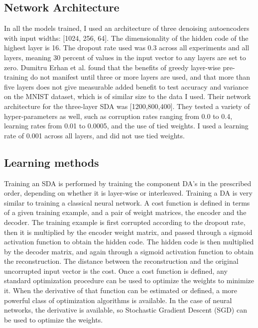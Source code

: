\documentclass[12pt]{article}
\begin{document}
\begin{doublespacing}
	\subsection{Network Architecture}
	In all the models trained, I used an architecture of three denoising autoencoders with input widths: [1024, 256, 64]. The dimensionality of the hidden code of the highest layer is 16. The dropout rate used was 0.3 across all experiments and all layers, meaning 30 percent of values in the input vector to any layers are set to zero. Dumitru Erhan et al. \cite{erhan2009difficulty} found that the benefits of greedy layer-wise pre-training do not manifest until three or more layers are used, and that more than five layers does not give measurable added benefit to test accuracy and variance on the MNIST dataset, which is of similar size to the data I used. Their network architecture for the three-layer SDA was [1200,800,400]. They tested a variety of hyper-parameters as well, such as corruption rates ranging from 0.0  to 0.4,  learning rates from 0.01 to 0.0005, and the use of tied weights. I used a learning rate of 0.001 across all layers, and did not use tied weights. 
	
	\subsection{Learning methods}
	Training an SDA is performed by training the component DA's in the prescribed order, depending on whether it is layer-wise or interleaved. Training a DA is very similar to training a classical neural network. A cost function is defined in terms of a given training example, and a pair of weight matrices, the encoder and the decoder. The training example is first corrupted according to the dropout rate, then it is multiplied by the encoder weight matrix, and passed through a sigmoid activation function to obtain the hidden code. The hidden code is then multiplied by the decoder matrix, and again through a sigmoid activation function to obtain the reconstruction. The distance between the reconstruction and the original uncorrupted input vector is the cost. Once a cost function is defined, any standard optimization procedure can be used to optimize the weights to minimize it. When the derivative of that function can be estimated or defined, a more powerful class of optimization algorithms is available. In the case of neural networks, the derivative is available, so Stochastic Gradient Descent (SGD) can be used to optimize the weights. 


\end{doublespacing}
\end{document}
